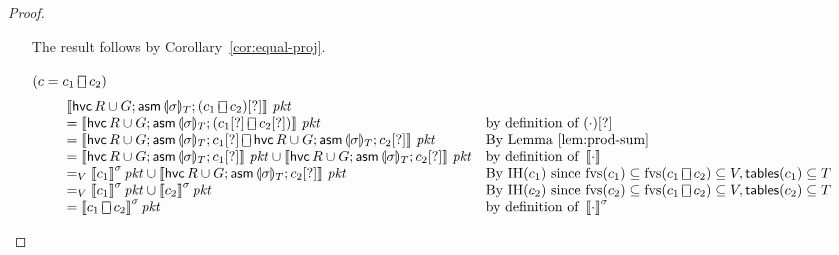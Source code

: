 \documentclass{article}
\newcommand{\pkt}{\mathit{pkt}}
\newcommand{\denote}[1]{\left\llbracket#1\right\rrbracket}
\newcommand{\assume}{\mathop{\mathsf{asm}}}
\newcommand{\choiceop}{\rotatebox[origin=c]{90}{$\sqsubset\!\!\!\sqsupset$}}
\newcommand{\choice}{\mathbin{\choiceop}}
\newcommand{\havoc}[1]{\mathop{\mathsf{hvc}}#1}
\newcommand{\state}[1]{\llparenthesis#1\rrparenthesis}
\newcommand{\instr}{[?]}
\newcommand{\fvs}{\textrm{fvs}}
\newcommand{\tables}{\mathop{\mathsf{tables}}}
\theoremstyle{plain}
\theoremstyle{definition}
\theoremstyle{remark}
\begin{document}
\begin{proof}
\begin{enumerate}[align=left]
    The result follows by Corollary~\ref{cor:equal-proj}.

  \item[$(c = c_1\choice c_2)$]
    \[\begin{array}{ll}
    \denote{\havoc{R \cup G};\assume{\state\sigma_{T}}; (c_1 \choice c_2)\instr}\,\pkt
    & \\
    = \denote{\havoc{R \cup G};\assume{\state\sigma_{T}}; (c_1\instr \choice c_2\instr)}\,\pkt
    & \text{by definition of }(\cdot)\instr\\
    = \denote{\havoc{R \cup G};\assume{\state\sigma_{T}}; c_1\instr
      \choice \havoc{R \cup G};\assume{\state\sigma_{T}}; c_2\instr}\,\pkt
    & \text{By Lemma~\ref{lem:prod-sum}} \\
    = \denote{\havoc{R \cup G}; \assume{\state\sigma_{T}}; c_1\instr}\,\pkt
    \cup \denote{\havoc{R \cup G}; \assume{\state\sigma_{T}}; c_2\instr}\,\pkt
    & \text{by definition of }\denote{\cdot} \\
    =_V \denote{c_1}^\sigma\pkt \cup \denote{\havoc{R \cup G}; \assume{\state\sigma_{T}}; c_2\instr}\,\pkt
    & \text{By IH}(c_1) \text{ since } \fvs(c_1) \subseteq \fvs(c_1 \choice c_2) \subseteq V, \tables(c_1) \subseteq T \\
    =_V \denote{c_1}^\sigma\pkt \cup \denote{c_2}^\sigma\pkt
    & \text{By IH}(c_2) \text{ since } \fvs(c_2) \subseteq \fvs(c_1 \choice c_2) \subseteq V, \tables(c_2) \subseteq T \\
    = \denote{c_1 \choice c_2}^\sigma\pkt
    & \text{by definition of }\denote{\cdot}^\sigma
    \end{array}
    \]


\end{enumerate}
\end{proof}
\end{document}
